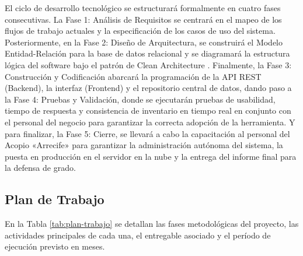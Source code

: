 El ciclo de desarrollo tecnológico se estructurará formalmente en cuatro fases consecutivas. La Fase 1: Análisis de Requisitos se centrará en el mapeo de los flujos de trabajo actuales y la especificación de los casos de uso del sistema. Posteriormente, en la Fase 2: Diseño de Arquitectura, se construirá el Modelo Entidad-Relación para la base de datos relacional y se diagramará la estructura lógica del software bajo el patrón de Clean Architecture \parencite{martin2018}. Finalmente, la Fase 3: Construcción y Codificación abarcará la programación de la API REST (Backend), la interfaz (Frontend) y el repositorio central de datos, dando paso a la Fase 4: Pruebas y Validación, donde se ejecutarán pruebas de usabilidad, tiempo de respuesta y consistencia de inventario en tiempo real en conjunto con el personal del negocio para garantizar la correcta adopción de la herramienta. Y para finalizar, la Fase 5: Cierre, se llevará a cabo la capacitación al personal del Acopio «Arrecife» para garantizar la administración autónoma del sistema, la puesta en producción en el servidor en la nube y la entrega del informe final para la defensa de grado.

\subsection{Plan de Trabajo}

En la Tabla \ref{tab:plan-trabajo} se detallan las fases metodológicas del proyecto, las actividades principales de cada una, el entregable asociado y el período de ejecución previsto en meses.

